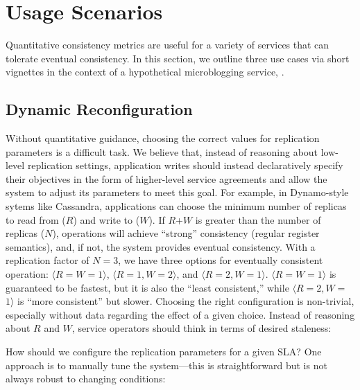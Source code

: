 \section{Usage Scenarios}
\label{sec:scenarios}

Quantitative consistency metrics are useful for a variety of services
that can tolerate eventual consistency. In this section, we outline
three use cases via short vignettes in the context of a hypothetical
microblogging service, {\systemname}.

\subsection{Dynamic Reconfiguration}
\label{sec:dynamic}

Without quantitative guidance, choosing the correct values for
replication parameters is a difficult task. We believe that, instead
of reasoning about low-level replication settings, application writes
should instead declaratively specify their objectives in the form of
higher-level service agreements and allow the system to adjust its
parameters to meet this goal. For example, in Dynamo-style sytems like
Cassandra, applications can choose the minimum number of replicas to
read from ($R$) and write to ($W$). If $R$+$W$ is greater than the
number of replicas ($N$), operations will achieve ``strong''
consistency (regular register semantics), and, if not, the system
provides eventual consistency. With a replication factor of $N=3$, we
have three options for eventually consistent operation: $\langle
R$$=$$W$$=$$1\rangle$, $\langle R$$=$$1$$, W$$=$$2\rangle$, and
$\langle R$$=$$2$$, W$$=$$1\rangle$.  $\langle R$$=$$W$$=$$1\rangle$
is guaranteed to be fastest, but it is also the ``least consistent,''
while $\langle R$$=$$2$$, W$$=$$1\rangle$ is ``more consistent'' but
slower. Choosing the right configuration is non-trivial, especially
without data regarding the effect of a given choice. Instead of
reasoning about $R$ and $W$, service operators should think in terms
of desired staleness:


How should we configure the replication parameters for a given SLA?
One approach is to manually tune the system---this is straightforward
but is not %
always robust to changing conditions:

